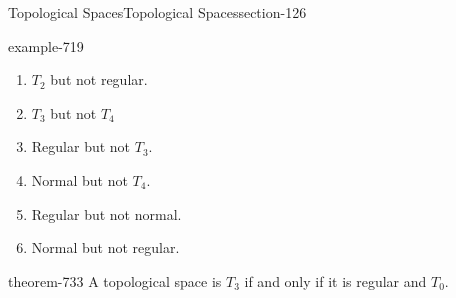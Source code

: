 \documentclass[oneside,10pt,]{article}
\begin{document}
\begin{sectionptx}{Topological Spaces}{}{Topological Spaces}{}{}{section-126}
\begin{example}{}{example-719}
\begin{enumerate}
\item\hypertarget{li-722}{}\(T_2\) but not regular.%
\item\hypertarget{li-724}{}\(T_3\) but not \(T_4\)%
\item\hypertarget{li-727}{}Regular but not \(T_3\).%
\item\hypertarget{li-729}{}Normal but not \(T_4\).%
\item\hypertarget{li-731}{}Regular but not normal.%
\item\hypertarget{li-732}{}Normal but not regular.%
\end{enumerate}
\end{example}
\begin{theorem}{}{}{theorem-733}%
\hypertarget{p-734}{}%
A topological space is \(T_3\) if and only if it is regular and \(T_0\).%
\end{theorem}
\end{sectionptx}
%
%
\typeout{************************************************}
\typeout{************************************************}
%
\end{document}
